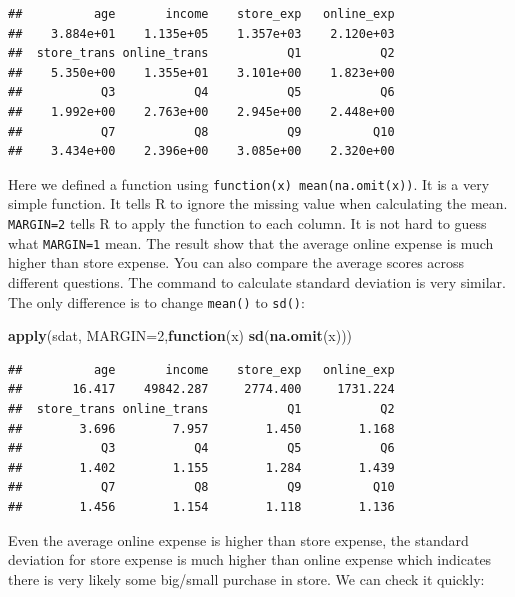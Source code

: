 \documentclass[12pt,]{krantz}
\makeatletter
\newenvironment{Shaded}{\begin{snugshade}}{\end{snugshade}}
\newcommand{\ControlFlowTok}[1]{\textcolor[rgb]{0.27,0.27,0.27}{\textbf{#1}}}
\newcommand{\DataTypeTok}[1]{\textcolor[rgb]{0.27,0.27,0.27}{#1}}
\newcommand{\DecValTok}[1]{\textcolor[rgb]{0.06,0.06,0.06}{#1}}
\newcommand{\KeywordTok}[1]{\textcolor[rgb]{0.27,0.27,0.27}{\textbf{#1}}}
\newcommand{\NormalTok}[1]{#1}
\newcommand{\OperatorTok}[1]{\textcolor[rgb]{0.43,0.43,0.43}{\textbf{#1}}}
\newenvironment{kframe}{%
\medskip{}
\setlength{\fboxsep}{.8em}
 \def\at@end@of@kframe{}%
 \ifinner\ifhmode%
  \def\at@end@of@kframe{\end{minipage}}%
  \begin{minipage}{\columnwidth}%
 \fi\fi%
 \def\FrameCommand##1{\hskip\@totalleftmargin \hskip-\fboxsep
 \colorbox{shadecolor}{##1}\hskip-\fboxsep
     \hskip-\linewidth \hskip-\@totalleftmargin \hskip\columnwidth}%
 \MakeFramed {\advance\hsize-\width
   \@totalleftmargin\z@ \linewidth\hsize
   \@setminipage}}%
 {\par\unskip\endMakeFramed%
 \at@end@of@kframe}
\renewenvironment{Shaded}{\begin{kframe}}{\end{kframe}}
\makeatother
\begin{document}
\begin{verbatim}
##          age       income    store_exp   online_exp 
##    3.884e+01    1.135e+05    1.357e+03    2.120e+03 
##  store_trans online_trans           Q1           Q2 
##    5.350e+00    1.355e+01    3.101e+00    1.823e+00 
##           Q3           Q4           Q5           Q6 
##    1.992e+00    2.763e+00    2.945e+00    2.448e+00 
##           Q7           Q8           Q9          Q10 
##    3.434e+00    2.396e+00    3.085e+00    2.320e+00
\end{verbatim}

Here we defined a function using \texttt{function(x)\ mean(na.omit(x))}. It is a very simple function. It tells R to ignore the missing value when calculating the mean. \texttt{MARGIN=2} tells R to apply the function to each column. It is not hard to guess what \texttt{MARGIN=1} mean. The result show that the average online expense is much higher than store expense. You can also compare the average scores across different questions. The command to calculate standard deviation is very similar. The only difference is to change \texttt{mean()} to \texttt{sd()}:

\begin{Shaded}
\begin{Highlighting}[]
\KeywordTok{apply}\NormalTok{(sdat, }\DataTypeTok{MARGIN=}\DecValTok{2}\NormalTok{,}\ControlFlowTok{function}\NormalTok{(x) }\KeywordTok{sd}\NormalTok{(}\KeywordTok{na.omit}\NormalTok{(x)))}
\end{Highlighting}
\end{Shaded}

\begin{verbatim}
##          age       income    store_exp   online_exp 
##       16.417    49842.287     2774.400     1731.224 
##  store_trans online_trans           Q1           Q2 
##        3.696        7.957        1.450        1.168 
##           Q3           Q4           Q5           Q6 
##        1.402        1.155        1.284        1.439 
##           Q7           Q8           Q9          Q10 
##        1.456        1.154        1.118        1.136
\end{verbatim}

Even the average online expense is higher than store expense, the standard deviation for store expense is much higher than online expense which indicates there is very likely some big/small purchase in store. We can check it quickly:

\begin{Shaded}
\end{Shaded}
\end{document}
